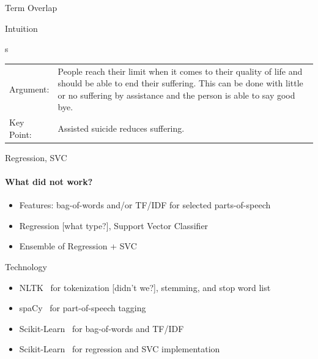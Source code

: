 \documentclass[english,handout]{mlutalk}
\newcommand{\TFIDF}{\mbox{TF/IDF}\xspace}
\newcommand{\todo}[1]{{\smaller\color{red}[#1]}}
\begin{document}
\begin{frame}[allowframebreaks]{Term Overlap}
\begin{block}{Intuition}
    \begin{example}s
      \smaller
      \begin{tabular}{lp{}}
        Argument: & People reach their limit when it comes to their quality of life and should be able to end their {\color{blue} suffering}. This can be done with little or no {\color{blue} suffering} by {\color{orange} assistance} and the person is able to say good bye. \\
        Key Point: & {\color{orange} Assisted} suicide reduces {\color{blue} suffering}.
      \end{tabular}
    \end{example}
  \end{block}

\end{frame}

\begin{frame}{Regression, SVC}
  
  \framesubtitle{What did not work?}
  
  \begin{itemize}
    \item Features: bag-of-words and/or \TFIDF for selected parts-of-speech
    \item Regression \todo{what type?}, Support Vector Classifier
    \item Ensemble of Regression + SVC
  \end{itemize}
  
  \begin{block}{Technology}
      \begin{itemize}
        \item NLTK~\cite{Bird2006} for tokenization \todo{didn't we?}, stemming,  and stop word list
        \item spaCy~\cite{HonnibalMVLB2020} for part-of-speech tagging
        \item Scikit-Learn~\cite{PedregosaVGMTGBPWDVPCBPD2011} for bag-of-words and \TFIDF
        \item Scikit-Learn~\cite{PedregosaVGMTGBPWDVPCBPD2011} for regression and SVC implementation
      \end{itemize}
  \end{block}

\end{frame}
\end{document}
